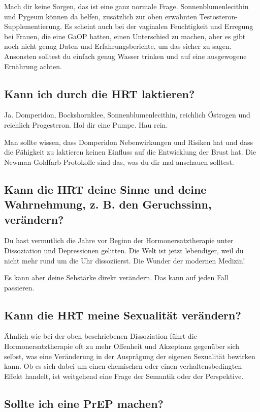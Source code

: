 \documentclass{article}
\begin{document}
{{{Mach dir keine Sorgen, das ist eine ganz normale Frage. Sonnenblumenlecithin und Pygeum können da helfen, zusätzlich zur oben erwähnten Testosteron-Supplementierung. Es scheint auch bei der vaginalen Feuchtigkeit und Erregung bei Frauen, die eine GaOP hatten, einen Unterschied zu machen, aber es gibt noch nicht genug Daten und Erfahrungsberichte, um das sicher zu sagen. Ansonsten solltest du einfach genug Wasser trinken und auf eine ausgewogene Ernährung achten.

\subsection{Kann ich durch die HRT laktieren?}

Ja. Domperidon, Bockshornklee, Sonnenblumenlecithin, reichlich Östrogen und reichlich Progesteron. Hol dir eine Pumpe. Hau rein.

Man sollte wissen, dass Domperidon Nebenwirkungen und Risiken hat und dass die Fähigkeit zu laktieren keinen Einfluss auf die Entwicklung der Brust hat. Die Newman-Goldfarb-Protokolle sind das, was du dir mal anschauen solltest.

\subsection{Kann die HRT deine Sinne und deine Wahrnehmung, z. B. den Geruchssinn, verändern?}

Du hast vermutlich die Jahre vor Beginn der Hormonersatztherapie unter Dissoziation und Depressionen gelitten. Die Welt ist jetzt lebendiger, weil du nicht mehr rund um die Uhr dissoziierst. Die Wunder der modernen Medizin!

Es kann aber deine Sehstärke direkt verändern. Das kann auf jeden Fall passieren.

\subsection{Kann die HRT meine Sexualität verändern?}

Ähnlich wie bei der oben beschriebenen Dissoziation führt die Hormonersatztherapie oft zu mehr Offenheit und Akzeptanz gegenüber sich selbst, was eine Veränderung in der Ausprägung der eigenen Sexualität bewirken kann. Ob es sich dabei um einen chemischen oder einen verhaltensbedingten Effekt handelt, ist weitgehend eine Frage der Semantik oder der Perspektive.

\subsection{Sollte ich eine PrEP machen?}\label{11-25}

}}}
\end{document}
